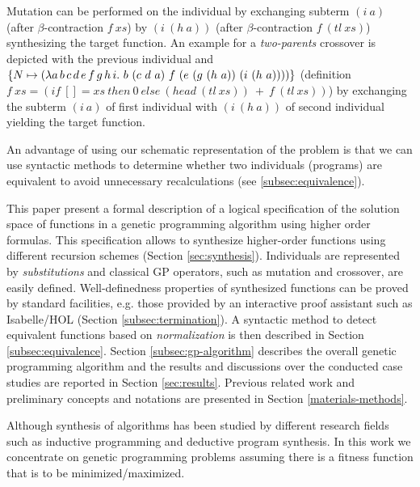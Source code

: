 Mutation can be performed on the individual by exchanging subterm $(i\ a)$ (after $\beta$-contraction $f\ xs$) by $(i\ (h\ a))$ (after $\beta$-contraction $f\ (tl\ xs)$) synthesizing the target function. An example for a {\em two-parents} crossover is depicted with the previous individual and $\{N \mapsto (\lambda a\, b\, c\, \-d\,\- e\,\- f\, g\, h\, i.\ b\ (c\ d\ a)\ f\-\ (e\-\ (g\ (h\ a))\-\ (i\ (h\ a))))\}$ (definition $f\ xs = (if\ [] = xs\ then\ 0\ else\ (head\ (tl\ xs))\ +\ f\ (tl\ xs))$) by exchanging the subterm $(i\ a)$ of first individual with $(i\ (h\ a))$ of second individual yielding the target function.
\cbend

An advantage of using our schematic representation of the problem is that we can use syntactic methods to determine whether two individuals (programs) are equivalent to avoid unnecessary recalculations (see \ref{subsec:equivalence}).

This paper present a formal description of a logical specification of the solution space of functions in a genetic programming algorithm using higher order formulas. This specification allows to synthesize higher-order functions using different recursion schemes (Section \ref{sec:synthesis}). \cbstart Individuals are represented by {\it substitutions} and classical GP operators, such as mutation and crossover, are easily defined\cbend. Well-definedness properties of synthesized functions can be proved by standard facilities, e.g. those provided by an interactive proof assistant such as Isabelle/HOL (Section \ref{subsec:termination}). A syntactic method to detect equivalent functions based on {\it normalization} is then described in Section \ref{subsec:equivalence}. Section \ref{subsec:gp-algorithm} describes the overall genetic programming algorithm and the results and discussions over the conducted case studies are reported in Section \ref{sec:results}. Previous related work and preliminary concepts and notations are presented in Section \ref{materials-methods}.

\cbstart
Although synthesis of algorithms has been studied by different research fields such as inductive programming and deductive program synthesis. In this work we concentrate on genetic programming problems assuming there is a fitness function that is to be minimized/maximized.
\cbend



